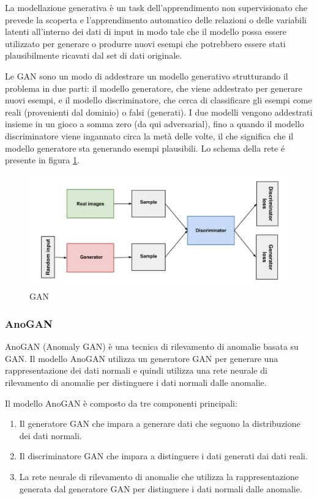 La modellazione generativa è un task dell'apprendimento non supervisionato che prevede la scoperta e l'apprendimento automatico delle relazioni o delle variabili latenti all'interno dei dati di input in modo tale che il modello possa essere utilizzato per generare o produrre nuovi esempi che potrebbero essere stati plausibilmente ricavati dal set di dati originale.

Le GAN sono un modo di addestrare un modello generativo strutturando il problema in due parti: il modello generatore, che viene addestrato per generare nuovi esempi, e il modello discriminatore, che cerca di classificare gli esempi come reali (provenienti dal dominio) o falsi (generati). I due modelli vengono addestrati insieme in un gioco a somma zero (da qui adversarial), fino a quando il modello discriminatore viene ingannato circa la metà delle volte, il che significa che il modello generatore sta generando esempi plausibili. Lo schema della rete é presente in figura \ref{gan}.
\begin{figure}[t]
	\centering
	\includegraphics[width=12cm, scale=1]{images/gan}
	\caption{GAN}
	\label{gan}
\end{figure}

\subsubsection{AnoGAN}
AnoGAN (Anomaly GAN) è una tecnica di rilevamento di anomalie basata su GAN. Il modello AnoGAN utilizza un generatore GAN per generare una rappresentazione dei dati normali e quindi utilizza una rete neurale di rilevamento di anomalie per distinguere i dati normali dalle anomalie.

Il modello AnoGAN è composto da tre componenti principali:

\begin{enumerate}
\item Il generatore GAN che impara a generare dati che seguono la distribuzione dei dati normali.
\item Il discriminatore GAN che impara a distinguere i dati generati dai dati reali.
\item La rete neurale di rilevamento di anomalie che utilizza la rappresentazione generata dal generatore GAN per distinguere i dati normali dalle anomalie.
\end{enumerate}



